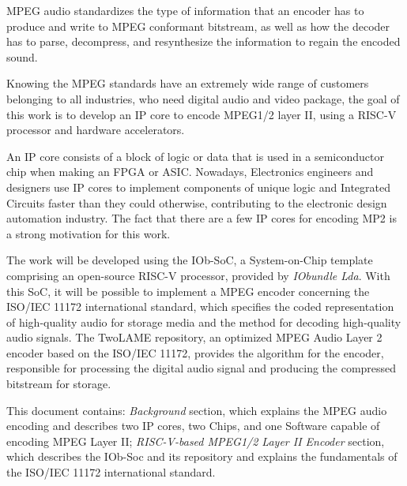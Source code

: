
MPEG audio standardizes the type of information that an encoder has to produce and write to MPEG conformant bitstream, as well as how the decoder has to parse, decompress, and resynthesize the information to regain the encoded sound.


Knowing the MPEG standards have an extremely wide range of customers belonging to all industries, who need digital audio and video package, the goal of this work is to develop an IP core to encode MPEG1/2 layer II, using a RISC-V processor and hardware accelerators.

An IP core consists of a block of logic or data that is used in a semiconductor chip when making an FPGA or ASIC.
Nowadays, Electronics engineers and designers use IP cores to implement components of unique logic and Integrated Circuits faster than they could otherwise, contributing to the electronic design automation industry. The fact that there are a few IP cores for encoding MP2 is a strong motivation for this work.

The work will be developed using the IOb-SoC, a System-on-Chip template comprising an open-source RISC-V processor, provided by \textit{IObundle Lda}. 
With this SoC, it will be possible to implement a MPEG encoder concerning the ISO/IEC 11172 international standard, which specifies the coded representation of high-quality audio for storage media and the method for decoding high-quality audio signals. The TwoLAME repository, an optimized MPEG Audio Layer 2 encoder based on the ISO/IEC 11172, provides the algorithm for the encoder, responsible for processing the digital audio signal and producing the compressed bitstream for storage.

This document contains: \textit{Background} section, which explains the MPEG audio encoding and describes two IP cores, two Chips, and one Software capable of encoding MPEG Layer II; \textit{RISC-V-based MPEG1/2 Layer II Encoder} section, which describes the IOb-Soc and its repository and explains the fundamentals of the ISO/IEC 11172 international standard.
